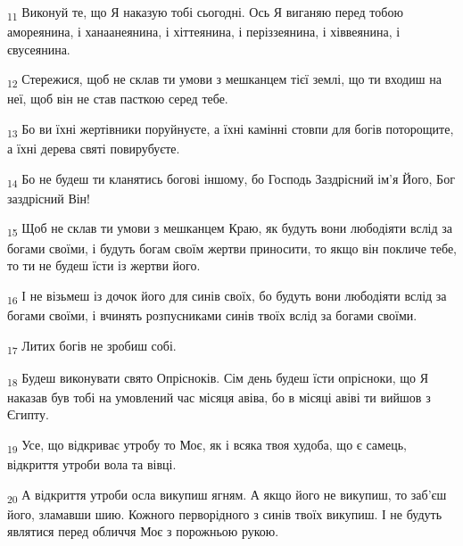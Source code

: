 \begin{tcolorbox}
\textsubscript{11} Виконуй те, що Я наказую тобі сьогодні. Ось Я виганяю перед тобою амореянина, і ханаанеянина, і хіттеянина, і періззеянина, і хіввеянина, і євусеянина.
\end{tcolorbox}
\begin{tcolorbox}
\textsubscript{12} Стережися, щоб не склав ти умови з мешканцем тієї землі, що ти входиш на неї, щоб він не став пасткою серед тебе.
\end{tcolorbox}
\begin{tcolorbox}
\textsubscript{13} Бо ви їхні жертівники поруйнуєте, а їхні камінні стовпи для богів поторощите, а їхні дерева святі повирубуєте.
\end{tcolorbox}
\begin{tcolorbox}
\textsubscript{14} Бо не будеш ти кланятись богові іншому, бо Господь Заздрісний ім'я Його, Бог заздрісний Він!
\end{tcolorbox}
\begin{tcolorbox}
\textsubscript{15} Щоб не склав ти умови з мешканцем Краю, як будуть вони любодіяти вслід за богами своїми, і будуть богам своїм жертви приносити, то якщо він покличе тебе, то ти не будеш їсти із жертви його.
\end{tcolorbox}
\begin{tcolorbox}
\textsubscript{16} І не візьмеш із дочок його для синів своїх, бо будуть вони любодіяти вслід за богами своїми, і вчинять розпусниками синів твоїх вслід за богами своїми.
\end{tcolorbox}
\begin{tcolorbox}
\textsubscript{17} Литих богів не зробиш собі.
\end{tcolorbox}
\begin{tcolorbox}
\textsubscript{18} Будеш виконувати свято Опрісноків. Сім день будеш їсти опрісноки, що Я наказав був тобі на умовлений час місяця авіва, бо в місяці авіві ти вийшов з Єгипту.
\end{tcolorbox}
\begin{tcolorbox}
\textsubscript{19} Усе, що відкриває утробу то Моє, як і всяка твоя худоба, що є самець, відкриття утроби вола та вівці.
\end{tcolorbox}
\begin{tcolorbox}
\textsubscript{20} А відкриття утроби осла викупиш ягням. А якщо його не викупиш, то заб'єш його, зламавши шию. Кожного перворідного з синів твоїх викупиш. І не будуть являтися перед обличчя Моє з порожньою рукою.
\end{tcolorbox}
